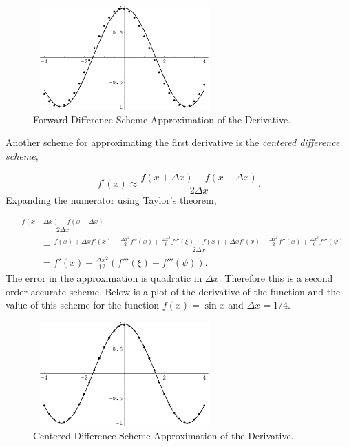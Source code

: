 \begin{example}
 
\begin{figure}[h!]
\begin{minipage}{\textwidth}
\begin{center}
\includegraphics[height=4cm,width=7cm]{fwdsin.eps}
\end{center}
\end{minipage}
\caption{Forward Difference Scheme Approximation of the Derivative.} %
\label{fig:fwdsin}
\label{fwdsin}
\end{figure}


Another scheme for approximating the first derivative is the 
\textit{centered difference scheme},

\[
  f'(x) \approx \frac{f(x+\Delta x) - f(x-\Delta x)}{2 \Delta x}.
\]
Expanding the numerator using Taylor's theorem,

\begin{align*}
    &\frac{f(x+\Delta x) - f(x-\Delta x)}{2 \Delta x} \\
    &\qquad= \frac{f(x) + \Delta x f'(x) + \frac{\Delta x^2}{2} f''(x)
      + \frac{\Delta x^3}{6} f'''(\xi)
      - f(x) + \Delta x f'(x) - \frac{\Delta x^2}{2} f''(x)
      + \frac{\Delta x^3}{6} f'''(\psi) }{2 \Delta x} \\
    &\qquad= f'(x) + \frac{\Delta x^2}{12}(f'''(\xi) + f'''(\psi)).
\end{align*}
The error in the approximation is quadratic in $\Delta x$.  Therefore
this is a second order accurate scheme.
Below is a plot of the derivative of the function and the 
value of this scheme for the function $f(x) = \sin x$ and $\Delta x = 1/4$.

\begin{figure}[h!]
\begin{minipage}{\textwidth}
\begin{center}
\includegraphics[height=4cm,width=7cm]{ctrsin.eps}
\end{center}
\end{minipage}
\caption{Centered Difference Scheme Approximation of the Derivative.} %
\label{fig:ctrsin}
\label{ctrsin}
\end{figure}


\end{example}
